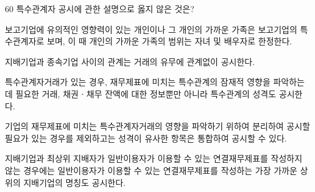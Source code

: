 \begin{question}{60}
특수관계자 공시에 관한 설명으로 옳지 않은 것은?
\begin{choices}
  \item 보고기업에 유의적인 영향력이 있는 개인이나 그 개인의 가까운 가족은 보고기업의 특수관계자로 보며, 이 때 개인의 가까운 가족의 범위는 자녀 및 배우자로 한정한다.
  \item 지배기업과 종속기업 사이의 관계는 거래의 유무에 관계없이 공시한다.
  \item 특수관계자거래가 있는 경우, 재무제표에 미치는 특수관계의 잠재적 영향을 파악하는 데 필요한 거래, 채권ㆍ채무 잔액에 대한 정보뿐만 아니라 특수관계의 성격도 공시한다.
  \item 기업의 재무제표에 미치는 특수관계자거래의 영향을 파악하기 위하여 분리하여 공시할 필요가 있는 경우를 제외하고는 성격이 유사한 항목은 통합하여 공시할 수 있다.
  \item 지배기업과 최상위 지배자가 일반이용자가 이용할 수 있는 연결재무제표를 작성하지 않는 경우에는 일반이용자가 이용할 수 있는 연결재무제표를 작성하는 가장 가까운 상위의 지배기업의 명칭도 공시한다.
\end{choices}
\end{question}
